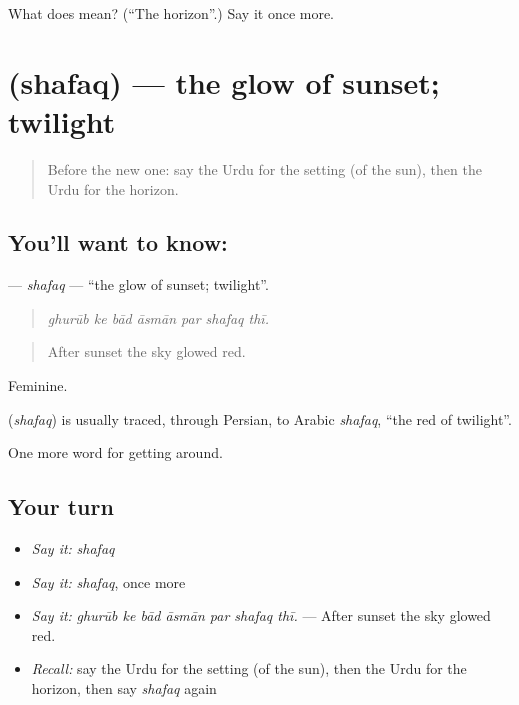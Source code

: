 \begin{tcolorbox}[breakable,colback=teal!4,colframe=teal!35!black,title={Before you move on}]
What does  mean? (\textquotedblleft{}The horizon\textquotedblright{}.) Say it once more.
\end{tcolorbox}
\section[\texorpdfstring{\ur{شفق} (shafaq)}{شفق (shafaq)}]{ (shafaq) — the glow of sunset; twilight}

\label{lesson:UR-C432-shafaq}



\begin{quote}
Before the new one: say the Urdu for the setting (of the sun), then the Urdu for the horizon.
\end{quote}

\subsection*{You'll want to know: }
\textbf{} — \emph{shafaq} — \textquotedblleft{}the glow of sunset; twilight\textquotedblright{}.

\begin{quote}
      
\end{quote}

\begin{quote}
\emph{ghurūb ke bād āsmān par shafaq thī.}
\end{quote}

\begin{quote}
After sunset the sky glowed red.
\end{quote}

Feminine.

\begin{cousinweb}
\textbf{} (\emph{shafaq}) is usually traced, through Persian, to Arabic \emph{shafaq}, \textquotedblleft{}the red of twilight\textquotedblright{}.
\end{cousinweb}

\begin{grammarlens}[title={What you've built}]
One more word for getting around.
\end{grammarlens}

\subsection*{Your turn}
\begin{itemize}
\raggedright
  \item \emph{Say it:} \emph{shafaq}
  \item \emph{Say it:} \emph{shafaq}, once more
  \item \emph{Say it:} \emph{ghurūb ke bād āsmān par shafaq thī.} — After sunset the sky glowed red.
  \item \emph{Recall:} say the Urdu for the setting (of the sun), then the Urdu for the horizon, then say \emph{shafaq} again
\end{itemize}

